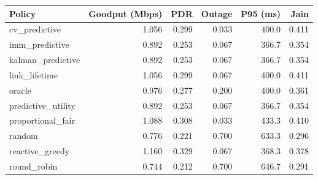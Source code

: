 \begin{tabular}{lrrrrr}
\toprule
Policy & Goodput (Mbps) & PDR & Outage & P95 (ms) & Jain \\
\midrule
cv\_predictive & 1.056 & 0.299 & 0.033 & 400.0 & 0.411 \\
imm\_predictive & 0.892 & 0.253 & 0.067 & 366.7 & 0.354 \\
kalman\_predictive & 0.892 & 0.253 & 0.067 & 366.7 & 0.354 \\
link\_lifetime & 1.056 & 0.299 & 0.067 & 400.0 & 0.411 \\
oracle & 0.976 & 0.277 & 0.200 & 400.0 & 0.361 \\
predictive\_utility & 0.892 & 0.253 & 0.067 & 366.7 & 0.354 \\
proportional\_fair & 1.088 & 0.308 & 0.033 & 433.3 & 0.410 \\
random & 0.776 & 0.221 & 0.700 & 633.3 & 0.296 \\
reactive\_greedy & 1.160 & 0.329 & 0.067 & 368.3 & 0.378 \\
round\_robin & 0.744 & 0.212 & 0.700 & 646.7 & 0.291 \\
\bottomrule
\end{tabular}
